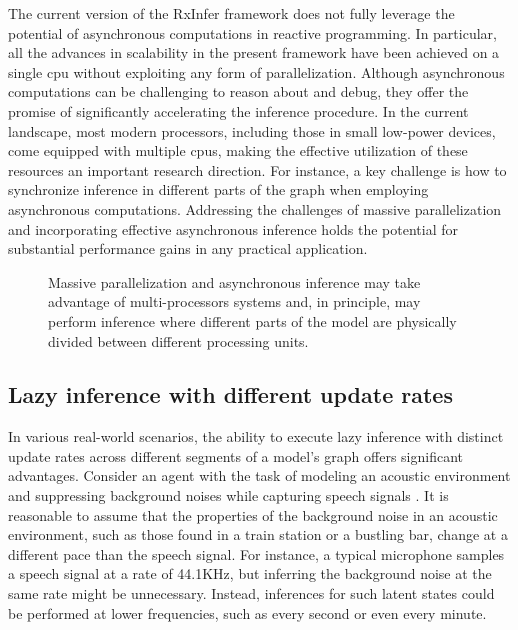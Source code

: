 The current version of the RxInfer framework does not fully leverage the potential of
asynchronous computations in reactive programming.
In particular, all the advances in scalability in the present framework have been achieved on a single \ac{cpu}
without exploiting any form of parallelization.
Although asynchronous computations can be challenging to reason about and debug, they offer the
promise of significantly accelerating the inference procedure.
In the current landscape, most modern processors, including those in small low-power devices,
come equipped with multiple \acp{cpu}, making the effective utilization of these resources an
important research direction.
For instance, a key challenge is how to synchronize inference in different parts of the graph
when employing asynchronous computations.
Addressing the challenges of massive parallelization and incorporating effective asynchronous
inference holds the potential for substantial performance gains in any practical application.
\begin{figure}
  \centering
  \resizebox{0.85\textwidth}{!}{}
  \caption{Massive parallelization and asynchronous inference may take advantage of multi-processors systems 
  and, in principle, may perform inference where different parts of the model are physically divided between different 
  processing units.}
  \label{fig:conclusion:parallel}
\end{figure}

\subsection{Lazy inference with different update rates}

In various real-world scenarios, the ability to execute lazy inference with distinct update
rates across different segments of a model's graph offers significant advantages.
Consider an agent with the task of modeling an acoustic environment and suppressing background
noises while capturing speech signals \citep{podusenko_aida_2022}.
It is reasonable to assume that the properties of the background noise in an acoustic environment, such as those
found in a train station or a bustling bar, change at a different pace than the speech signal.
For instance, a typical microphone samples a speech signal at a rate of 44.1KHz, but inferring
the background noise at the same rate might be unnecessary.
Instead, inferences for such latent states could be performed at lower frequencies, such as every second or even every minute.

